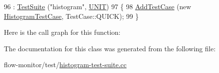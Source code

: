 \begin{DoxyCode}
96   : \hyperlink{classns3_1_1TestSuite_a904b0c40583b744d30908aeb94636d1a}{TestSuite} (\textcolor{stringliteral}{"histogram"}, \hyperlink{classns3_1_1TestSuite_a1ebfcab34ec8161e085e8e3a1855eae0a3885375a3787abf60431f8454b3cadbd}{UNIT})
97 \{
98   \hyperlink{classns3_1_1TestCase_a3718088e3eefd5d6454569d2e0ddd835}{AddTestCase} (\textcolor{keyword}{new} \hyperlink{classHistogramTestCase}{HistogramTestCase}, TestCase::QUICK);
99 \}
\end{DoxyCode}


Here is the call graph for this function\+:




The documentation for this class was generated from the following file\+:\begin{DoxyCompactItemize}
\item 
flow-\/monitor/test/\hyperlink{histogram-test-suite_8cc}{histogram-\/test-\/suite.\+cc}\end{DoxyCompactItemize}
